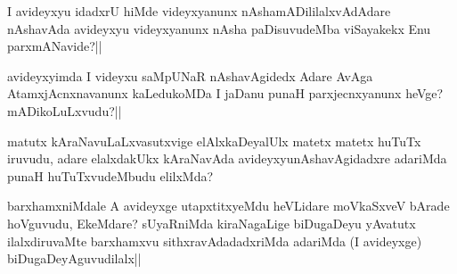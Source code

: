 
\begin{artha}
I avideyxyu idadxrU hiMde videyxyanunx nAshamADililalxvAdAdare nAshavAda avideyxyu videyxyanunx nAsha paDisuvudeMba viSayakekx Enu parxmANavide?||
\end{artha}

\begin{artha}
avideyxyimda I videyxu saMpUNaR nAshavAgidedx Adare AvAga AtamxjAcnxnavanunx kaLedukoMDa I jaDanu punaH parxjecnxyanunx heVge? mADikoLuLxvudu?||
\end{artha}

\begin{artha}
matutx kAraNavuLaLxvasutxvige elAlxkaDeyalUlx matetx matetx huTuTx iruvudu, adare elalxdakUkx kAraNavAda avideyxyunAshavAgidadxre adariMda punaH huTuTxvudeMbudu elilxMda?
\end{artha}

\begin{artha}
barxhamxniMdale A avideyxge utapxtitxyeMdu heVLidare moVkaSxveV bArade hoVguvudu, EkeMdare? sUyaRniMda kiraNagaLige biDugaDeyu yAvatutx ilalxdiruvaMte barxhamxvu sithxravAdadadxriMda adariMda (I avideyxge) biDugaDeyAguvudilalx||
\end{artha}
